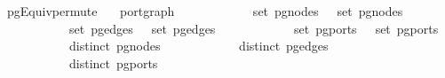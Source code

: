 \isamarkupfalse%
\ pgEquiv{\isacharunderscore}permute{\isacharcolon}\isanewline
\ \ \ {\isachardoublequoteopen}port{\isacharunderscore}graph\ \isanewline
\ \ \ \ \ \ \ \ \ \ \ {\isachardoublequoteopen}set\ {\isacharparenleft}pg{\isacharunderscore}nodes\ \ {\isacharequal}\ set\ {\isacharparenleft}pg{\isacharunderscore}nodes\ \isanewline
\ \ \ \ \ \ \ \ \ \ \ {\isachardoublequoteopen}set\ {\isacharparenleft}pg{\isacharunderscore}edges\ \ {\isacharequal}\ set\ {\isacharparenleft}pg{\isacharunderscore}edges\ \isanewline
\ \ \ \ \ \ \ \ \ \ \ {\isachardoublequoteopen}set\ {\isacharparenleft}pg{\isacharunderscore}ports\ \ {\isacharequal}\ set\ {\isacharparenleft}pg{\isacharunderscore}ports\ \isanewline
\ \ \ \ \ \ \ \ \ \ \ {\isachardoublequoteopen}distinct\ {\isacharparenleft}pg{\isacharunderscore}nodes\ \isanewline
\ \ \ \ \ \ \ \ \ \ \ {\isachardoublequoteopen}distinct\ {\isacharparenleft}pg{\isacharunderscore}edges\ \isanewline
\ \ \ \ \ \ \ \ \ \ \ {\isachardoublequoteopen}distinct\ {\isacharparenleft}pg{\isacharunderscore}ports\ \isanewline
\ \ \ \ \ \ \ {\isachardoublequoteopen}\ {\isasymapprox}\ 
